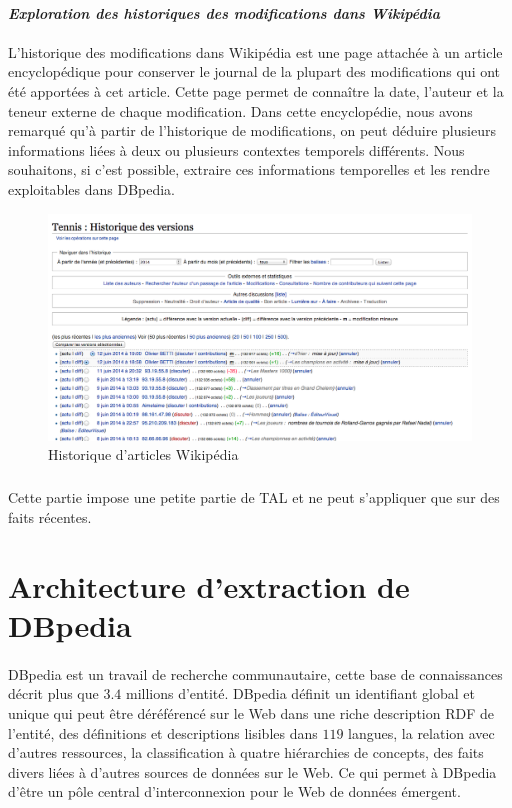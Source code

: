 \paragraph{}
\textbf{{\it Exploration des historiques des modifications dans Wikipédia}}
\paragraph{}
L'historique des modifications dans Wikipédia est une page attachée à un article encyclopédique pour conserver le journal de la plupart des modifications qui ont été apportées à cet article. Cette page permet de connaître la date, l'auteur et la teneur externe de chaque modification.
Dans cette encyclopédie, nous avons remarqué qu'à partir de l'historique de modifications, on peut déduire plusieurs informations liées à deux ou plusieurs contextes temporels différents.
Nous souhaitons, si c’est possible, extraire ces informations temporelles et les rendre exploitables dans DBpedia.
\begin{figure}[H]
\centering
\includegraphics[width=14cm]{NEWHISTORIQUE.png}
\caption{Historique d'articles Wikipédia}
\end{figure}
\subparagraph{}
Cette partie impose une petite partie de TAL et ne peut s'appliquer que sur des faits récentes.
\newpage
\section{Architecture d'extraction de DBpedia}
\paragraph{}
DBpedia est un travail de recherche communautaire, cette base de connaissances décrit plus que $3.4$ millions d'entité. DBpedia définit un identifiant global et unique qui peut être déréférencé sur le Web dans une riche description RDF de l'entité, des définitions et descriptions lisibles dans $119$ langues, la relation avec d'autres ressources, la classification à quatre hiérarchies de concepts, des faits divers liées à d'autres sources de données sur le Web. Ce qui permet à DBpedia d'être un pôle central d'interconnexion pour le Web de données émergent.   
